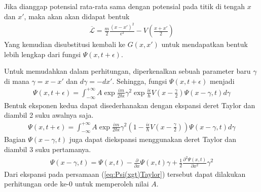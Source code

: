 Jika dianggap potensial rata-rata sama dengan potensial pada titik di tengah \(x\) dan \(x'\), maka akan akan didapat bentuk
\begin{align}
    \overline{\mathcal{L}} = \frac{m}{2}\frac{(x-x')^2}{\epsilon^2} - V\left(\frac{x+x'}{2}\right)
\end{align}
Yang kemudian disubstitusi kembali ke \(G(x,x')\) untuk mendapatkan bentuk lebih lengkap dari fungsi \(\Psi(x,t+\epsilon)\).
\par Untuk memudahkan dalam perhitungan, diperkenalkan sebuah parameter baru \(\gamma\) di mana \(\gamma = x - x'\) dan \(d\gamma = -dx'\). Sehingga, fungsi \(\Psi(x,t+\epsilon)\) menjadi
\begin{align}
    \Psi(x,t+\epsilon) = \int_{-\infty}^{+\infty} A \exp{\frac{im}{2\hbar\epsilon}\gamma^2} \exp{\frac{i\epsilon}{\hbar}V\left(x-\frac{\gamma}{2}\right)}\Psi(x-\gamma,t)d\gamma
\end{align}
Bentuk eksponen kedua dapat disederhanakan dengan ekspansi deret Taylor dan diambil 2 suku awalnya saja.
\begin{align}
    \Psi(x,t+\epsilon) = \int_{-\infty}^{+\infty} A \exp{\frac{im}{2\hbar\epsilon}\gamma^2} \left(1 - \frac{i\epsilon}{\hbar}V\left(x - \frac{\gamma}{2}\right)\right)\Psi(x-\gamma,t)d\gamma
    \label{eq:VTaylor1}
\end{align}
Bagian \(\Psi(x-\gamma,t)\) juga dapat diekspansi menggunakan deret Taylor dan diambil 3 suku pertamanya.
\begin{align}
    \Psi(x-\gamma,t) = \Psi(x,t) - \frac{\partial}{\partial x}\Psi(x,t)\gamma + \frac{1}{2}\frac{\partial^2\Psi(x,t)}{\partial x^2} \gamma^2
    \label{eq:Psi(xgt)Taylor}
\end{align}
Dari ekspansi pada persamaan (\ref{eq:Psi(xgt)Taylor}) tersebut dapat dilakukan perhitungan orde ke-0 untuk memperoleh nilai \(A\).

